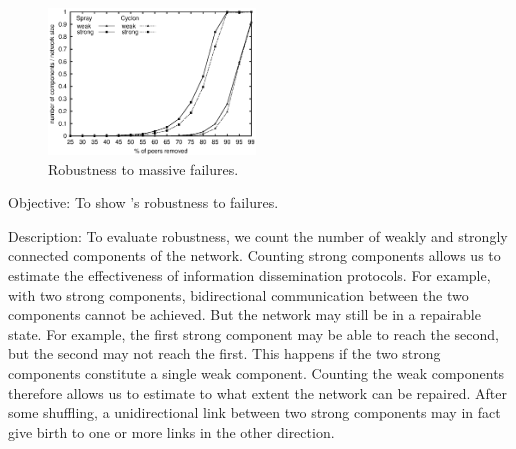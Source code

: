 \begin{figure}
  \centering
  \includegraphics[width=0.49\textwidth]{img/resilience.eps}
  \caption{\label{fig:resilience}Robustness to massive failures.}
\end{figure}

\begin{asparadesc}
\item[Objective:] To show \SPRAY's robustness to failures.
\item[Description:] To evaluate robustness, we count the number of
  weakly and strongly connected components of the network. Counting
  strong components allows us to estimate the effectiveness of
  information dissemination protocols. For example, with two strong
  components, bidirectional communication between the two components
  cannot be achieved. But the network may still be in a repairable
  state.  For example, the first strong component may be able to reach
  the second, but the second may not reach the first. This happens if
  the two strong components constitute a single weak
  component. Counting the weak components therefore allows us to
  estimate to what extent the network can be repaired.  After some
  shuffling, a unidirectional link between two strong components may
  in fact give birth to one or more links in the other direction.


\end{asparadesc}
